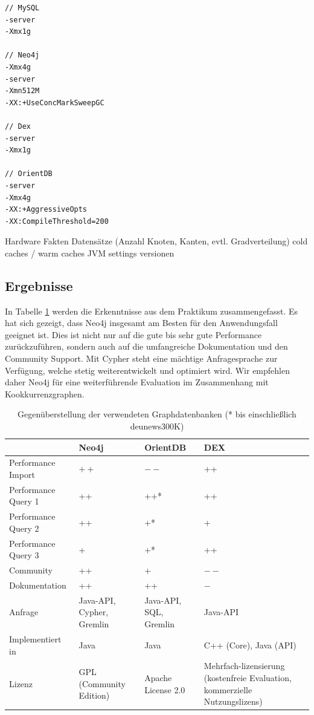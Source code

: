 \documentclass[11pt, a4paper, oneside]{article} %
\begin{document}
\begin{lstlisting}
// MySQL
-server
-Xmx1g

// Neo4j
-Xmx4g
-server
-Xmn512M
-XX:+UseConcMarkSweepGC

// Dex
-server
-Xmx1g

// OrientDB
-server
-Xmx4g
-XX:+AggressiveOpts 
-XX:CompileThreshold=200
\end{lstlisting}


Hardware Fakten
Datensätze (Anzahl Knoten, Kanten, evtl. Gradverteilung)
cold caches / warm caches
JVM settings
versionen

\subsection{Ergebnisse}

In Tabelle \ref{tab:compare} werden die Erkenntnisse aus dem Praktikum zusammengefasst. Es hat sich gezeigt, dass Neo4j insgesamt am Besten für den Anwendungsfall geeignet ist. Dies ist nicht nur auf die gute bis sehr gute Performance zurückzuführen, sondern auch auf die umfangreiche Dokumentation und den Community Support. Mit Cypher steht eine mächtige Anfragesprache zur Verfügung, welche stetig weiterentwickelt und optimiert wird. Wir empfehlen daher Neo4j für eine weiterführende Evaluation im Zusammenhang mit Kookkurrenzgraphen.

\renewcommand{\arraystretch}{1.5}

\begin{table}[ht]
\begin{tabular}{|l||p{2.5cm}|p{2.5cm}|p{2.5cm}|}
\hline 
 & \textbf{Neo4j} & \textbf{OrientDB} & \textbf{DEX} \\ 
\hline
Performance Import & $++$ & $--$ & ++ \\ 
\hline 
Performance Query 1 & ++ & ++* & ++ \\ 
\hline 
Performance Query 2 & ++ & +* & + \\ 
\hline 
Performance Query 3 & + & +* & ++ \\ 
\hline
Community & ++ & + & $--$ \\ 
\hline 
Dokumentation & ++ & ++ & $-$ \\
\hline 
Anfrage & Java-API, Cypher, Gremlin & Java-API, SQL, Gremlin & Java-API \\
\hline
Implementiert in & Java & Java & C++ (Core), Java (API) \\
\hline 
Lizenz & GPL (Community Edition) & Apache License 2.0 & Mehrfach-lizensierung (kostenfreie Evaluation, kommerzielle Nutzungslizens)	 \\ 
\hline 
\end{tabular}
\caption{Gegenüberstellung der verwendeten Graphdatenbanken (* bis einschließlich deu\textunderscore news\textunderscore 300K)}
\label{tab:compare}
\end{table}
\end{document}
